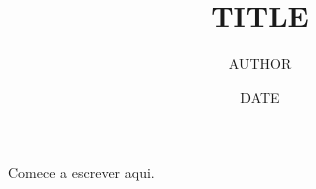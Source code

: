 \documentclass[11pt]{article}
\title{{{TITLE}}}
\author{{{AUTHOR}}}
\date{{{DATE}}}
\begin{document}
\maketitle

Comece a escrever aqui.
\end{document}
